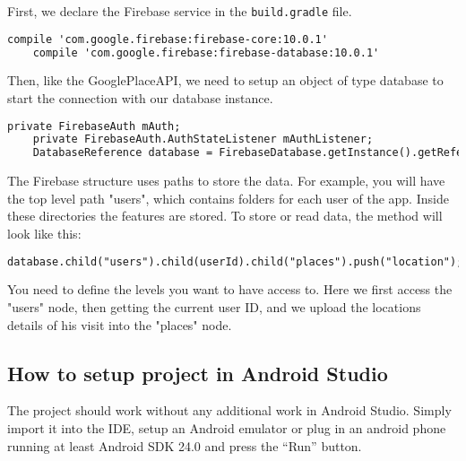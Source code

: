 First, we declare the Firebase service in the \texttt{build.gradle} file.
\begin{lstlisting}[language=XML, basicstyle=\scriptsize]
    compile 'com.google.firebase:firebase-core:10.0.1'
    compile 'com.google.firebase:firebase-database:10.0.1'
\end{lstlisting}

Then, like the GooglePlaceAPI, we need to setup an object of type database to start the connection with our database instance.

\begin{lstlisting}[language=XML, basicstyle=\scriptsize]
    private FirebaseAuth mAuth;
    private FirebaseAuth.AuthStateListener mAuthListener;
    DatabaseReference database = FirebaseDatabase.getInstance().getReference();
\end{lstlisting}

The Firebase structure uses paths to store the data. For example, you will have the top level path "users", which contains folders for each user of the app. Inside these directories the features are stored. To store or read data, the method will look like this:

\begin{lstlisting}[language=XML, basicstyle=\scriptsize]
    database.child("users").child(userId).child("places").push("location");
\end{lstlisting}
You need to define the levels you want to have access to. Here we first access the "users" node, then getting the current user ID, and we upload the locations details of his visit into the "places" node.

\subsection{How to setup project in Android Studio}
The project should work without any additional work in Android Studio. Simply import it into the IDE, setup an Android emulator or plug in an android phone running at least Android SDK 24.0 and press the ``Run'' button.